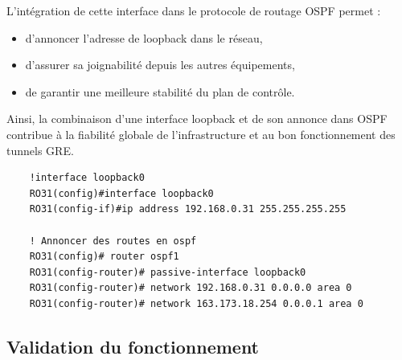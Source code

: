 \documentclass[12pt,a4paper, oneside]{memoir}
\begin{document}
\begin{enumerate}
L’intégration de cette interface dans le protocole de routage OSPF permet :
\begin{itemize}
	\item d’annoncer l’adresse de loopback dans le réseau,
	\item d’assurer sa joignabilité depuis les autres équipements,
	\item de garantir une meilleure stabilité du plan de contrôle.
\end{itemize}

Ainsi, la combinaison d’une interface loopback et de son annonce dans OSPF contribue à la fiabilité globale de l’infrastructure et au bon fonctionnement des tunnels GRE.

\begin{verbatim}
	!interface loopback0
	RO31(config)#interface loopback0
	RO31(config-if)#ip address 192.168.0.31 255.255.255.255
	
	! Annoncer des routes en ospf
	RO31(config)# router ospf1
	RO31(config-router)# passive-interface loopback0
	RO31(config-router)# network 192.168.0.31 0.0.0.0 area 0
	RO31(config-router)# network 163.173.18.254 0.0.0.1 area 0
\end{verbatim}
\end{enumerate}

\subsection{Validation du fonctionnement}
\end{document}
